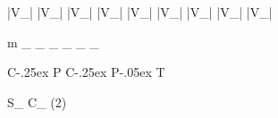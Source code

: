 \newmathsymbol{\Vud}              {|V_{\uquark\dquark}|}
\newmathsymbol{\Vcd}              {|V_{\cquark\dquark}|}
\newmathsymbol{\Vtd}              {|V_{\tquark\dquark}|}
\newmathsymbol{\Vus}              {|V_{\uquark\squark}|}
\newmathsymbol{\Vcs}              {|V_{\cquark\squark}|}
\newmathsymbol{\Vts}              {|V_{\tquark\squark}|}
\newmathsymbol{\Vub}              {|V_{\uquark\bquark}|}
\newmathsymbol{\Vcb}              {|V_{\cquark\bquark}|}
\newmathsymbol{\Vtb}              {|V_{\tquark\bquark}|}

\newmathsymbol{\DM}       {\Delta m}
\newmathsymbol{\DMs}      {\DM_{\squark}}
\newmathsymbol{\DMd}      {\DM_{\dquark}}
\newmathsymbol{\DG}       {\Delta\Gamma}
\newmathsymbol{\DGs}      {\DG_{\squark}}
\newmathsymbol{\DGd}      {\DG_{\dquark}}
\newmathsymbol{\Gs}       {\Gamma_{\squark}}
\newmathsymbol{\Gd}       {\Gamma_{\dquark}}


\newmathsymbol{\CP}               {C\kern-.25ex P}
\newmathsymbol{\CPT}              {C\kern-.25ex P\kern-.05ex T}
\newmathsymbol{\CPAsymmetry}      {\Asym{\CP}{}}

\newmathsymbol{\SJpsiKS}      {S_{\jpsi\KS}}
\newmathsymbol{\CJpsiKS}      {C_{\jpsi\KS}}
\newmathsymbol{\sintwobeta}   {\sin(2\beta)}
